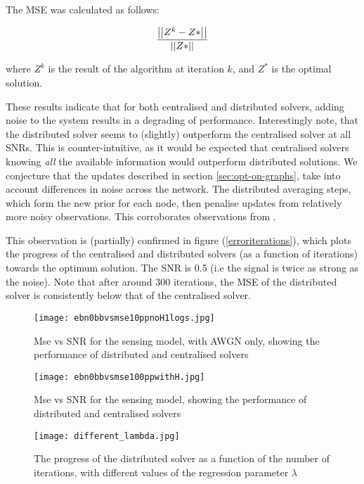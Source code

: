 The MSE was calculated as follows:

\begin{equation}
\frac{\left|\left|Z^k - Z*\right|\right|}{\left|\left|Z*\right|\right|}
\end{equation}

where \(Z^k\) is the result of the algorithm at iteration \(k\), and \(Z^*\) is the optimal solution.

These results indicate that for both centralised and distributed solvers, adding noise to the system results in a degrading of performance. Interestingly note, that the distributed solver seems to (slightly) outperform the centralised solver at all SNRs. This is counter-intuitive, as it would be expected that centralised solvers knowing \textit{all} the available information would outperform distributed solutions. We conjecture that the updates described in section \eqref{sec:opt-on-graphs}, take into account differences in noise across the network. The distributed averaging steps, which form the new prior for each node, then penalise updates from relatively more noisy observations. This corroborates observations from \cite{bazerque2008}.

This observation is (partially) confirmed in figure (\ref{erroriterations}), which plots the progress of the centralised and distributed solvers (as a function of iterations) towards the optimum solution. The SNR is 0.5 (i.e the signal is twice as strong as the noise). Note that after around 300 iterations, the MSE of the distributed solver is consistently below that of the centralised solver.

\begin{figure}[h]
\centering
\texttt{[image: ebn0bbvsmse10ppnoH1logs.jpg]}
\caption{Mse vs SNR for the sensing model, with AWGN only, showing the performance of distributed and centralised solvers}
\label{msevssnr0}
\end{figure}

\begin{figure}[h]
\centering
\texttt{[image: ebn0bbvsmse100ppwithH.jpg]}
\caption{Mse vs SNR for the sensing model, showing the performance of distributed and centralised solvers}
\label{msevssnr1}
\end{figure}

\begin{figure}[h]
\centering
\texttt{[image: different\_lambda.jpg]}
\caption{The progress of the distributed solver as a function of the number of iterations, with different values of the regression parameter \(\lambda\)}
\label{fig:differentLambda}
\end{figure}

